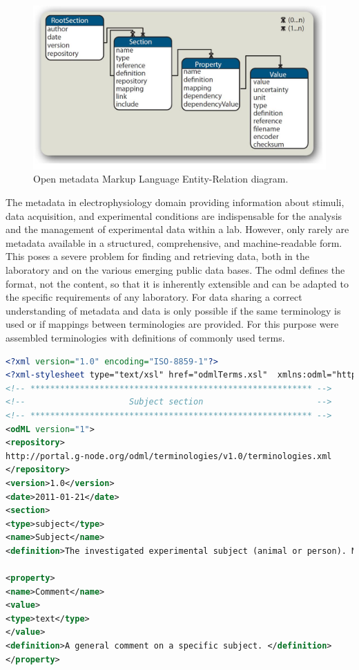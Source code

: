 \begin{figure}[h]
	\begin{center}
		\includegraphics[scale=0.4]{obrazky/odml_tree.jpg}
		\caption{Open metadata Markup Language Entity-Relation diagram. \cite{odml}}
		\label{odml-tree}
	\end{center}
\end{figure}	
The metadata in electrophysiology domain providing information about stimuli, data acquisition, and experimental conditions are indispensable for the analysis and the management of experimental data within a lab. However, only rarely are metadata available in a structured, comprehensive, and machine-readable form. This poses a severe problem for finding and retrieving data, both in the laboratory and on the various emerging public data bases. \cite{odml} The \gls{odml} defines the format, not the content, so that it is inherently extensible and can be adapted to the specific requirements of any laboratory. For data sharing a correct understanding of metadata and data is only possible if the same terminology is used or if mappings between terminologies are provided. For this purpose were assembled terminologies with definitions of commonly used terms. \cite{odmlarticle}


\begin{lstlisting}[language=xml,frame=single,label=odml_example,caption=Example of odml XML file.]
<?xml version="1.0" encoding="ISO-8859-1"?>
<?xml-stylesheet type="text/xsl" href="odmlTerms.xsl"  xmlns:odml="http://www.g-node.org/odml"?>
<!-- ********************************************************* -->
<!--                     Subject section                       -->
<!-- ********************************************************* -->
<odML version="1">
<repository>
http://portal.g-node.org/odml/terminologies/v1.0/terminologies.xml
</repository>
<version>1.0</version>
<date>2011-01-21</date>
<section>
<type>subject</type>
<name>Subject</name>
<definition>The investigated experimental subject (animal or person). May contain the Cell and Preparation sections as subsections.</definition>

<property>
<name>Comment</name>
<value>
<type>text</type>
</value>
<definition>A general comment on a specific subject. </definition>
</property>
\end{lstlisting} 



